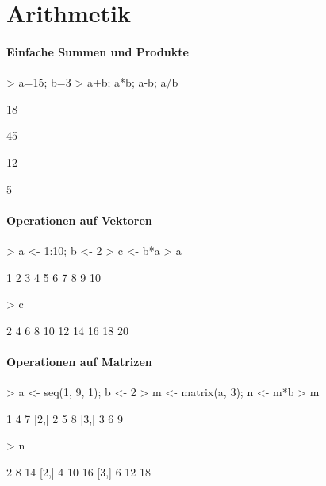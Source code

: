 \section{Arithmetik}
\paragraph{Einfache Summen und Produkte}
\begin{Schunk}
\begin{Sinput}
> a=15; b=3
> a+b; a*b; a-b; a/b
\end{Sinput}
\begin{Soutput}
[1] 18
\end{Soutput}
\begin{Soutput}
[1] 45
\end{Soutput}
\begin{Soutput}
[1] 12
\end{Soutput}
\begin{Soutput}
[1] 5
\end{Soutput}
\end{Schunk}

\paragraph{Operationen auf Vektoren}
\begin{Schunk}
\begin{Sinput}
> a <- 1:10; b <- 2
> c <- b*a
> a
\end{Sinput}
\begin{Soutput}
 [1]  1  2  3  4  5  6  7  8  9 10
\end{Soutput}
\begin{Sinput}
> c
\end{Sinput}
\begin{Soutput}
 [1]  2  4  6  8 10 12 14 16 18 20
\end{Soutput}
\end{Schunk}

\paragraph{Operationen auf Matrizen}
\begin{Schunk}
\begin{Sinput}
> a <- seq(1, 9, 1); b <- 2
> m <- matrix(a, 3); n <- m*b
> m
\end{Sinput}
\begin{Soutput}
     [,1] [,2] [,3]
[1,]    1    4    7
[2,]    2    5    8
[3,]    3    6    9
\end{Soutput}
\begin{Sinput}
> n
\end{Sinput}
\begin{Soutput}
     [,1] [,2] [,3]
[1,]    2    8   14
[2,]    4   10   16
[3,]    6   12   18
\end{Soutput}
\end{Schunk}


